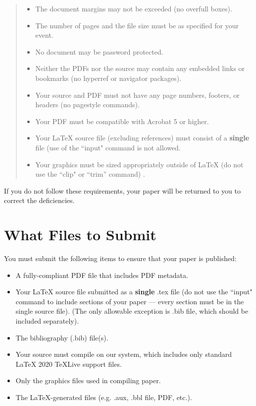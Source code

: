 \documentclass[letterpaper]{article} %
\begin{document}
\begin{quote}
\begin{itemize}
\item The document margins may not be exceeded (no overfull boxes).
\item The number of pages and the file size must be as specified for your event.
\item No document may be password protected.
\item Neither the PDFs nor the source may contain any embedded links or bookmarks (no hyperref or navigator packages).
\item Your source and PDF must not have any page numbers, footers, or headers (no pagestyle commands).
\item Your PDF must be compatible with Acrobat 5 or higher.
\item Your \LaTeX{} source file (excluding references) must consist of a \textbf{single} file (use of the ``input" command is not allowed.
\item Your graphics must be sized appropriately outside of \LaTeX{} (do not use the ``clip" or ``trim'' command) .
\end{itemize}
\end{quote}

If you do not follow these requirements, your paper will be returned to you to correct the deficiencies.

\section{What Files to Submit}
You must submit the following items to ensure that your paper is published:
\begin{itemize}
\item A fully-compliant PDF file that includes PDF metadata.
\item Your \LaTeX{} source file submitted as a \textbf{single} .tex file (do not use the ``input" command to include sections of your paper --- every section must be in the single source file). (The only allowable exception is .bib file, which should be included separately).
\item The bibliography (.bib) file(s).
\item Your source must compile on our system, which includes only standard \LaTeX{} 2020 TeXLive support files.
\item Only the graphics files used in compiling paper.
\item The \LaTeX{}-generated files (e.g. .aux,  .bbl file, PDF, etc.).
\end{itemize}
\end{document}
